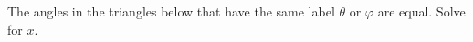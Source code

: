 The angles in the triangles below that have the same label $\theta$ or $\varphi$ are equal. Solve for $x$.
